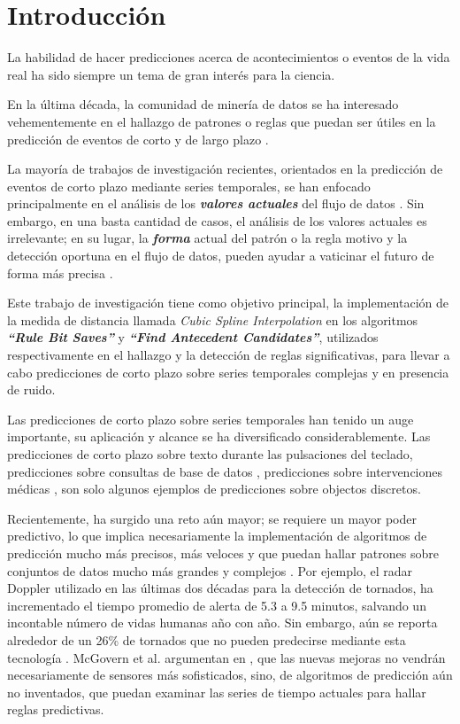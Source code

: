 \section{\textbf{Introducci\'on}}
La habilidad de hacer predicciones acerca de acontecimientos o eventos de la vida real ha sido siempre un tema de gran inter\'es para la ciencia.\par 
En la \'ultima d\'ecada, la comunidad de miner\'ia de datos se ha interesado vehementemente en el hallazgo de patrones o reglas que puedan ser \'utiles en la predicci\'on de eventos de corto y de largo plazo \cite{main}.\par
La mayor\'ia de trabajos de investigaci\'on recientes, orientados en la predicci\'on de eventos de corto plazo mediante series temporales, se han enfocado principalmente en el an\'alisis de los \textit{\textbf{valores actuales}} del flujo de datos \cite{rulediscovery}\cite{subsequencematching}. Sin embargo, en una basta cantidad de casos, el an\'alisis de los valores actuales es irrelevante; en su lugar, la \textit{\textbf{forma}} actual del patr\'on o la regla motivo y la detecci\'on oportuna en el flujo de datos, pueden ayudar a vaticinar el futuro de forma m\'as precisa \cite{main}.\par
Este trabajo de investigaci\'on tiene como objetivo principal, la implementaci\'on de la medida de distancia llamada \textit{Cubic Spline Interpolation} en los algoritmos \textit{\textbf{\enquote{Rule Bit Saves}}} y \textit{\textbf{\enquote{Find Antecedent Candidates}}}, utilizados respectivamente en el hallazgo y la detecci\'on de reglas significativas, para llevar a cabo predicciones de corto plazo sobre series temporales complejas y en presencia de ruido.\par
Las predicciones de corto plazo sobre series temporales han tenido un auge importante, su aplicaci\'on y alcance se ha diversificado considerablemente. Las predicciones de corto plazo sobre texto durante las pulsaciones del teclado, predicciones sobre consultas de base de datos \cite{type}, predicciones sobre intervenciones m\'edicas \cite{medical}, son solo algunos ejemplos de predicciones sobre objectos discretos.\par
Recientemente, ha surgido una reto a\'un mayor; se requiere un mayor poder predictivo, lo que implica necesariamente la implementaci\'on de algoritmos de predicci\'on mucho m\'as precisos, m\'as veloces y que puedan hallar patrones sobre conjuntos de datos mucho m\'as grandes y complejos \cite{robotics}. Por ejemplo, el radar Doppler utilizado en las \'ultimas dos d\'ecadas para la detecci\'on de tornados, ha incrementado el tiempo promedio de alerta de 5.3 a 9.5 minutos, salvando un incontable n\'umero de vidas humanas a\~no con a\~no. Sin embargo, a\'un se reporta alrededor de un 26\% de tornados que no pueden predecirse mediante esta tecnolog\'ia \cite{weatherforcasting}. McGovern et al. argumentan en \cite{weatherprediction}, que las nuevas mejoras no vendr\'an necesariamente de sensores m\'as sofisticados, sino, de algoritmos de predicci\'on a\'un no inventados, que puedan examinar las series de tiempo actuales para hallar reglas predictivas.\par
